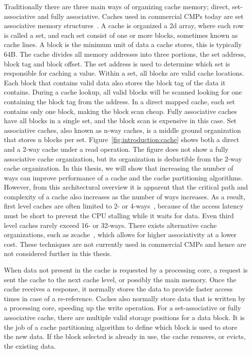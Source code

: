 Traditionally there are three main ways of organizing cache memory; direct, set-associative and fully associative.
Caches used in commercial CMPs today are set associative memory structures~\cite{Thomadakis2011, Jain2013, ARM2010, Ho2014}.
A cache is organized a 2d array, where each row is called a set, and each set consist of one or more blocks, sometimes known as cache lines.
A block is the minimum unit of data a cache stores, this is typically 64B.
The cache divides all memory addresses into three portions, the set address, block tag and block offset.
The set address is used to determine which set is responsible for caching a value.
Within a set, all blocks are valid cache locations.
Each block that contains valid data also stores the block tag of the data it contains.
During a cache lookup, all valid blocks will be scanned looking for one containing the block tag from the address.
In a direct mapped cache, each set contains only one block, making the block scan cheap.
Fully associative caches have all blocks in a single set, and the block scan is expensive in this case.
Set associative caches, also known as n-way caches, is a middle ground organization that stores n blocks per set.
Figure~\ref{fig:introduction:cache} shows both a direct and a 2-way cache under a read operation.
The figure does not show a fully associative cache organization, but its organization is deductible from the 2-way cache organization.
In this thesis, we will show that increasing the number of ways can improve performance of a cache and the cache partitioning algorithms.
However, from this architectural overview it is apparent that the critical path and complexity of a cache also increases as the number of ways increases.
As a result, first level caches are often limited to 2- or 4-ways~\cite{Sanchez2010}, because of the access latency must be short to prevent the CPU stalling while it waits for data. 
Even third level caches rarely exceed 16- or 32-ways.
There exists alternative cache organizations, such as zcache~\cite{Sanchez2010}, which allows for higher associativity at a lower cost.
These techniques are not currently used in commercial CMPs and hence are not considered further in this thesis.

When data not present in the cache is requested by a processing core, a request is sent the cache to the next cache level, or possibly the main memory.
Once the cache receives a response, it normally stores the data to provide faster access times in case of a re-reference.
Caches also normally store data that is written by a processing core, speeding up the write operation.
For a set-associative or fully associative cache, there are multiple valid storage positions for a data block.
It is the job of a cache partitioning algorithm to define which block is used to store the new data.
If the block selected is already in use, the cache removes, or evicts, the existing data.

